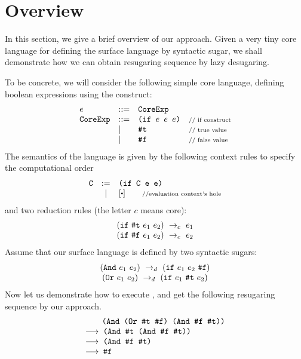 \section{Overview}
\label{sec2}


In this section, we give a brief overview of our approach. Given a very tiny core language for defining the surface language by syntactic sugar, we shall demonstrate how we can obtain resugaring sequence by lazy desugaring.


To be concrete, we will consider the following simple core language, defining boolean expressions using the  construct:
\[
\begin{array}{lllll}
e &::=& \mbox{\tt CoreExp}\\
\mbox{\tt CoreExp} &::=& \texttt{(if~$e$~$e$~$e$)} &\mbox{{\scriptsize // if construct}}\\
& |& \mbox{\tt \#t}  & \mbox{{\scriptsize // true value}}\\
& |& \mbox{\tt \#f} & \mbox{{\scriptsize // false value}}
\end{array}
\]
The semantics of the language is given by the following context rules to specify the computational order
\[
\begin{array}{lcl}
\m{C} &:=& \Code{(if C e e)}\\
&|&[\bigcdot] \qquad \note{//evaluation context's hole}\\
\end{array}
\]
and two reduction rules (the letter $c$ means core):
\[
\begin{array}{c}
    (\mbox{\tt if}~\mbox{\tt \#t}~e_1~e_2) ~\rightarrow_c~e_1\\
    (\mbox{\tt if}~\mbox{\tt \#f}~e_1~e_2) ~\rightarrow_c~e_2
\end{array}
\]
Assume that our surface language is defined by two syntactic sugars:
\[
\begin{array}{c}
(\mbox{\tt And}~e_1~e_2) ~\rightarrow_d~ (\mbox{\tt if}~e_1~e_2~\mbox{\tt \#f})\\
(\mbox{\tt Or}~e_1~e_2) ~\rightarrow_d~ (\mbox{\tt if}~e_1~\mbox{\tt \#t}~e_2)
\end{array}
\]
Now let us demonstrate how to execute , and get the following resugaring sequence by our approach.
\[
    \begin{array}{l}
        \qquad\Code{(And (Or \true~\false) (And \false~\true))}\\
        \OneStep{\Code{ (And \true~(And \false~\true))}}\\
        \OneStep{\Code{ (And \false~\true)}}\\
        \OneStep{\Code{ \false}}\\
    \end{array}
\]



